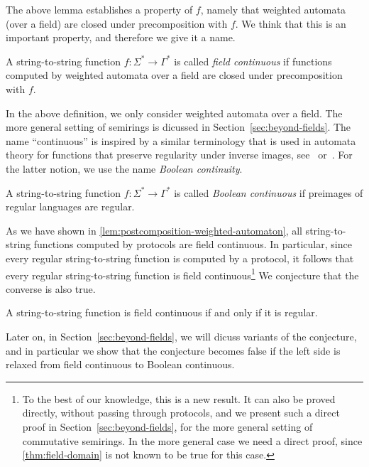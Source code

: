The above lemma establishes a property of $f$, namely that weighted automata (over a field) are closed under precomposition with $f$. We think that this is an important property, and therefore we give it a name.


\begin{definition}
    \label{def:weighted-continuity}
    A string-to-string function $f : \Sigma^* \to \Gamma^*$ is called \emph{field continuous} if functions computed by weighted automata over a field are closed under precomposition with $f$.
\end{definition}

In the above definition, we only consider weighted automata over a field. The more general setting of semirings is dicussed in Section~\ref{sec:beyond-fields}.
The name ``continuous'' is inspired by a similar terminology that is used in automata theory for functions that preserve regularity under inverse images, see~\cite[Theorem 4.1]{PinSilva05} or~\cite[Footnote 2]{continuity20}.  For the latter notion, we use the name \emph{Boolean continuity}.

\begin{definition}
    A string-to-string function $f : \Sigma^* \to \Gamma^*$ is called \emph{Boolean continuous} if preimages of regular languages are regular.
\end{definition}

As we have shown in \cref{lem:postcomposition-weighted-automaton}, all string-to-string functions computed by protocols are field continuous. In particular, since every regular string-to-string function is computed by a protocol, it follows that every regular string-to-string function is field continuous\footnote{To the best of our knowledge, this is a new result. It can also be proved directly, without passing through protocols, and we present such a direct proof in Section~\ref{sec:beyond-fields}, for the more general setting of commutative semirings. In the more general case we need a direct proof, since \cref{thm:field-domain} is not known to be true for this case.}
We conjecture that the converse is also true.

\begin{conjecture}\label{conj:regular-continuous}
    A string-to-string function is field continuous if and only if it is regular.
\end{conjecture}

Later on, in Section~\ref{sec:beyond-fields}, we will dicuss variants of the conjecture, and in particular we show that the conjecture becomes false if the left side is relaxed from field continuous to Boolean continuous.

